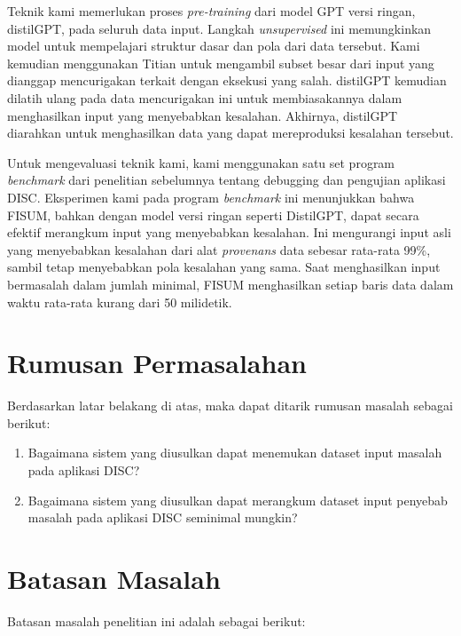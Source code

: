 Teknik kami memerlukan proses \emph{pre-training} dari model GPT versi ringan, distilGPT, pada seluruh data input. Langkah \emph{unsupervised} ini memungkinkan model untuk mempelajari struktur dasar dan pola dari data tersebut. Kami kemudian menggunakan Titian untuk mengambil subset besar dari input yang dianggap mencurigakan terkait dengan eksekusi yang salah. distilGPT kemudian dilatih ulang pada data mencurigakan ini untuk membiasakannya dalam menghasilkan input yang menyebabkan kesalahan. Akhirnya, distilGPT diarahkan untuk menghasilkan data yang dapat mereproduksi kesalahan tersebut.

Untuk mengevaluasi teknik kami, kami menggunakan satu set program \emph{ \emph{benchmark}} dari penelitian sebelumnya tentang debugging dan pengujian aplikasi DISC. Eksperimen kami pada program \emph{benchmark} ini menunjukkan bahwa FISUM, bahkan dengan model versi ringan seperti DistilGPT, dapat secara efektif merangkum input yang menyebabkan kesalahan. Ini mengurangi input asli yang menyebabkan kesalahan dari alat \emph{provenans} data sebesar rata-rata 99\%, sambil tetap menyebabkan pola kesalahan yang sama. Saat menghasilkan input bermasalah dalam jumlah minimal, FISUM menghasilkan setiap baris data dalam waktu rata-rata kurang dari 50 milidetik.

\section{Rumusan Permasalahan}
\label{sec:permasalahan}

Berdasarkan latar belakang di atas, maka dapat ditarik rumusan masalah sebagai berikut:

\begin{enumerate}[nolistsep]

   \item Bagaimana sistem yang diusulkan dapat menemukan dataset input masalah pada aplikasi DISC?

   \item Bagaimana sistem yang diusulkan dapat merangkum dataset input penyebab masalah pada aplikasi DISC seminimal mungkin?

\end{enumerate}

\section{Batasan Masalah}
\label{sec:batasanmasalah}

Batasan masalah penelitian ini adalah sebagai berikut:

